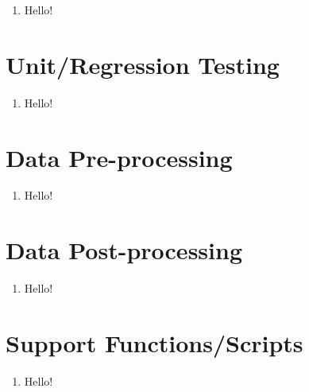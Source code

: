 \documentclass{article}
\begin{document}
\begin{enumerate}
	\item Hello!
\end{enumerate}	

	\section{Unit/Regression Testing}

\begin{enumerate}
	\item Hello!
\end{enumerate}	

	\section{Data Pre-processing}

\begin{enumerate}
	\item Hello!
\end{enumerate}	

	\section{Data Post-processing}

\begin{enumerate}
	\item Hello!
\end{enumerate}	

	\section{Support Functions/Scripts}

\begin{enumerate}
	\item Hello!
\end{enumerate}	
\end{document}
